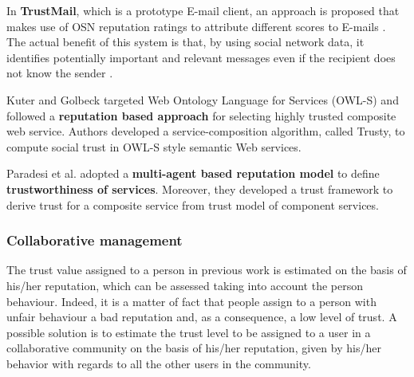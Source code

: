 In \textbf{TrustMail},
	which is a prototype E-mail client,
	an approach is proposed that makes use of OSN reputation ratings to attribute different scores to E-mails \cite{golbeck_reputation_2004}.
The actual benefit of this system is that,
	by using social network data,
	it identifies potentially important and relevant messages even if the recipient does not know the sender \cite{golbeck_reputation_2004}.


Kuter and Golbeck \cite{kuter_semantic_2009} targeted Web Ontology Language for Services (OWL-S) and followed a \textbf{reputation based approach} for selecting highly trusted composite web service.
Authors developed a service-composition algorithm, called Trusty, to compute social trust in OWL-S style semantic Web services.

Paradesi et al. \cite{paradesi_integrating_2009} adopted a \textbf{multi-agent based reputation model} to define \textbf{trustworthiness of services}.
Moreover,
	they developed a trust framework to derive trust for a composite service from trust model of component services.

\subsubsection{Collaborative management}


The trust value assigned to a person in previous work is estimated on the basis of his/her reputation,
	which can be assessed taking into account the person behaviour.
Indeed,
	it is a matter of fact that people assign to a person with unfair behaviour a bad reputation and,
	as a consequence,
	a low level of trust.
A possible solution is to estimate the trust level to be assigned to a user in a collaborative community on the basis of his/her reputation,
	given by his/her behavior with regards to all the other users in the community.


